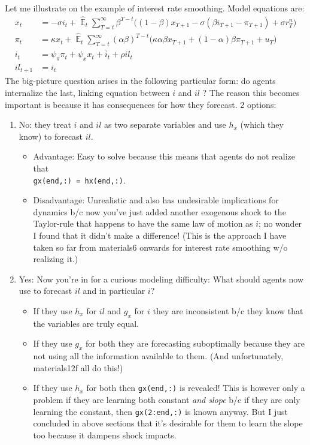 \documentclass[11pt]{article}
\renewcommand{\[}{\begin{equation}}
\renewcommand{\]}{\end{equation}}
\DeclareMathOperator{\E}{\mathbb{E}}
\begin{document}
Let me illustrate on the example of interest rate smoothing. Model equations are:
\begin{align*}
x_t &=  -\sigma i_t +\hat{\E}_t \sum_{T=t}^{\infty} \beta^{T-t }\big( (1-\beta)x_{T+1} - \sigma(\beta i_{T+1} - \pi_{T+1}) +\sigma r_T^n \big)   \\
\pi_t &= \kappa x_t +\hat{\E}_t \sum_{T=t}^{\infty} (\alpha\beta)^{T-t }\big( \kappa \alpha \beta x_{T+1} + (1-\alpha)\beta \pi_{T+1} + u_T\big)  \\
i_t &= \psi_{\pi}\pi_t + \psi_{x} x_t   + \bar{i}_t + \rho il_t \\
il_{t+1} & = i_t 
\end{align*}
The big-picture question arises in the following particular form: do agents internalize the last, linking equation between $i$ and $il$ ?
The reason this becomes important is because it has consequences for how they forecast. 2 options:
\begin{enumerate}
\item No: they treat $i$ and $il$ as two separate variables and use $h_x$ (which they know) to forecast $ il $.
\begin{itemize}
\item Advantage: Easy to solve because this means that agents do not realize that \\ \texttt{gx(end,:) = hx(end,:)}.
\item Disadvantage: Unrealistic and also has undesirable implications for dynamics b/c now you've just added another exogenous shock to the Taylor-rule that happens to have the same law of motion as $i$; no wonder I found that it didn't make a difference! (This is the approach I have taken so far from materials6 onwards for interest rate smoothing w/o realizing it.)
\end{itemize}
\item Yes: Now you're in for a curious modeling difficulty: What should agents now use to forecast $il$ and in particular $i$?
\begin{itemize}
\item If they use $h_x$ for $il$ and $g_x$ for $i$ they are inconsistent b/c they know that the variables are truly equal.
\item If they use $g_x$ for both they are forecasting suboptimally because they are not using all the information available to them. (And unfortunately, materials12f all do this!)
\item If they use $h_x$ for both then \texttt{gx(end,:)} is revealed! This is however only a problem if they are learning both constant \emph{and slope} b/c if they are only learning the constant, then  \texttt{gx(2:end,:)} is known anyway. But I just concluded in above sections that it's desirable for them to learn the slope too because it dampens shock impacts.
\end{itemize}

\end{enumerate}
\end{document}
